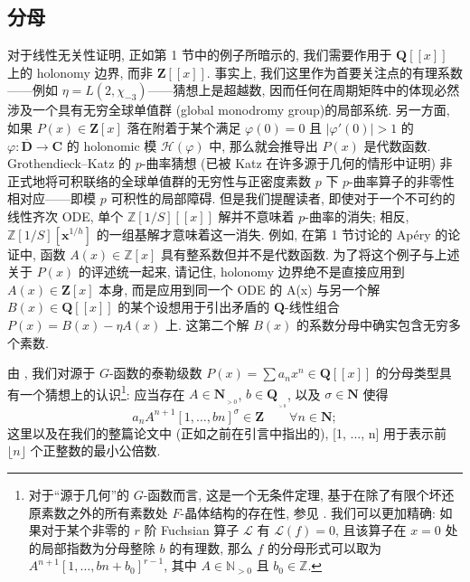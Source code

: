 \subsection{分母}\label{sec:2.2}

对于线性无关性证明, 正如第 1 节中的例子所暗示的, 我们需要作用于 \(\mathbf{Q}[\![x]\!]\) 上的 holonomy 边界, 而非 \(\mathbf{Z}[\![x]\!]\).
事实上, 我们这里作为首要关注点的有理系数——例如 \(\eta = L(2,\chi_{-3})\)——猜想上是超越数, 
因而任何在周期矩阵中的体现必然涉及一个具有无穷全球单值群 (global monodromy group)的局部系统.
另一方面, 如果 \(P(x) \in \mathbf{Z}[x]\) 落在附着于某个满足 \(\varphi(0) = 0\) 且 \(\lvert\varphi'(0)\rvert > 1\) 的 \(\varphi: \overline{\mathbf{D}} \to \mathbf{C}\) 的 holonomic 模 \(\mathcal{H}(\varphi)\) 中, 
那么就会推导出 \(P(x)\) 是代数函数.
Grothendieck--Katz 的 $p$-曲率猜想 \cite{And04} (已被 Katz 在许多源于几何的情形中证明) 非正式地将可积联络的全球单值群的无穷性与正密度素数 $p$ 下 $p$-曲率算子的非零性相对应——即模 $p$ 可积性的局部障碍.
但是我们提醒读者, 即使对于一个不可约的线性齐次 ODE, 
单个 \(\mathbb{Z}[1/S][\! [x]\!]\) 解并不意味着 $p$-曲率的消失; 
相反, \(\mathbb{Z}[1/S][\mathbf{x}^{1/h}]\) 的一组基解才意味着这一消失.
例如, 在第 1 节讨论的 Ap{\'e}ry 的论证中, 函数 \(A(x) \in \mathbb{Z}[x]\) 具有整系数但并不是代数函数.
为了将这个例子与上述关于 \(P(x)\) 的评述统一起来, 
请记住, holonomy 边界绝不是直接应用到 \(A(x) \in \mathbf{Z}[x]\) 本身, 
而是应用到同一个 ODE 的 A(x) 与另一个解 \(B(x) \in \mathbf{Q}[\![x]\!]\) 的某个设想用于引出矛盾的 \(\mathbf{Q}\)-线性组合 \(P(x) = B(x) - \eta A(x)\) 上.
这第二个解 \(B(x)\) 的系数分母中确实包含无穷多个素数.

由 \cite{And89}, 我们对源于 $G$-函数的泰勒级数 \(P(x) = \sum a_n x^n \in \mathbf{Q}[\![x]\!]\) 的分母类型具有一个猜想上的认识\footnote{对于“源于几何”的 $G$-函数而言, 这是一个无条件定理, 基于在除了有限个坏还原素数之外的所有素数处 $F$-晶体结构的存在性, 参见 \cite[§ V app.]{And89}. 我们可以更加精确: 如果对于某个非零的 $r$ 阶 Fuchsian 算子 $\mathcal{L}$ 有 $\mathcal{L}(f) = 0$, 且该算子在 $x = 0$ 处的局部指数为分母整除 $b$ 的有理数, 那么 $f$ 的分母形式可以取为 $A^{n+1}[1,\ldots,bn+b_0]^{r-1}$, 其中 $A \in \mathbb{N}_{>0}$ 且 $b_0 \in \mathbb{Z}$.}:
应当存在 \(A \in \mathbf{N}_{_{>0}}\), \(b \in \mathbf{Q}_{_{_{>0}}}\), 以及 \(\sigma \in \mathbf{N}\) 使得
\begin{equation}\label{eq:2.2.1}
a_n A^{n+1}[1, \dots, bn]^{\sigma} \in \mathbf{Z} \qquad \forall n \in \mathbf{N};
\end{equation}
这里以及在我们的整篇论文中 (正如之前在引言中指出的), [1, ..., n] 用于表示前 \(\lfloor n \rfloor\) 个正整数的最小公倍数.

